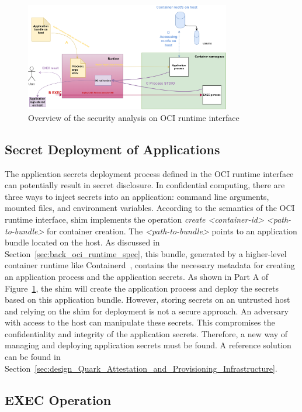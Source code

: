 \begin{figure}[htp]
  \centering
  \includegraphics[width=0.8\textwidth]{images/security_analysis.png}
  \caption[Overview of the security analysis on OCI runtime interface]{Overview of the security analysis on OCI runtime interface}
  \label{fig:security_analysis}
\end{figure}


\subsection{Secret Deployment of Applications}
The application secrets deployment process defined in the OCI runtime interface can potentially result in secret disclosure. In confidential computing, there are three ways to inject secrets into an application: command line arguments, mounted files, and environment variables. According to the semantics of the OCI runtime interface, shim implements the operation 
\emph{create <container-id> <path-to-bundle>} for container creation. The \emph{<path-to-bundle>} points to an application bundle located on the host. As discussed in Section~\ref{sec:back_oci_runtime_spec}, this bundle, generated by a higher-level container runtime like Containerd~\cite*{containerd}, contains the necessary metadata for creating an 
application process and the application secrets. As shown in Part A of Figure~\ref{fig:security_analysis}, the shim will create the application process and deploy the secrets based on this application bundle. However, storing secrets on an untrusted host and relying on the shim for deployment is not a secure approach. An adversary with access 
to the host can manipulate these secrets. This compromises the confidentiality and integrity of the application secrets. Therefore, a new way of managing and deploying application secrets must be found. A reference solution can be found in Section~\ref{sec:design_Quark_Attestation_and_Provisioning_Infrastructure}.

\subsection{EXEC Operation}
\label{sec:Security_OCI_EXEC}

